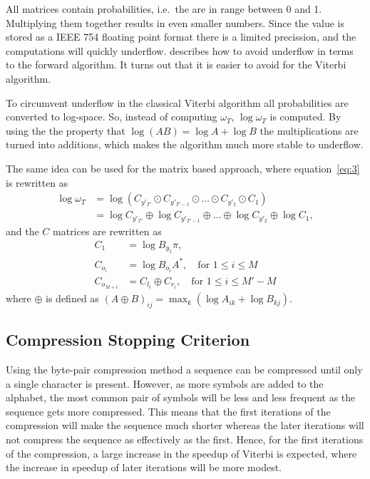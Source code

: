 All matrices contain probabilities, i.e.\ the are in range between 0 and
1. Multiplying them together results in even smaller numbers. Since the value
is stored as a IEEE 754 floating point format there is a limited precission,
and the computations will quickly underflow. \citet{sand2013ziphmmlib}
describes how to avoid underflow in terms to the forward algorithm. It turns
out that it is easier to avoid for the Viterbi algorithm.

To circumvent underflow in the classical Viterbi algorithm all probabilities
are converted to log-space. So, instead of computing $\omega_T$,
$\log \omega_T$ is computed. By using the the property that
$\log(AB) = \log A + \log B$ the multiplications are turned into additions,
which makes the algorithm much more stable to underflow.

The same idea can be used for the matrix based approach, where
equation~\eqref{eq:3} is rewritten as
\begin{align*}
  \log \omega_T &= \log \left(C_{y'_{T'}} \odot C_{y'_{T'-1}} \odot \dots \odot
                  C_{y'_2} \odot C_1 \right) \\
                &= \log C_{y'_{T'}} \oplus \log C_{y'_{T'-1}} \oplus \dots \oplus
                  \log C_{y'_2} \oplus \log C_1,
\end{align*}
and the $C$ matrices are rewritten as
\begin{align*}
  C_1 &= \log B_{y_1} \pi, \\
  C_{o_i} &= \log B_{o_i} A^*, \quad \text{for }1 \le i \le M\\
  C_{o_{M + i}} &= C_{l_i} \oplus C_{r_i} , \quad \text{for }1 \le i \le M' - M
\end{align*}
where $\oplus$ is defined as
${ \left( A \oplus B \right)}_{ij} = \max_k \left( \log A_{ik} + \log B_{kj}
\right)$.


\subsection{Compression Stopping Criterion}
\label{sec:compr-stopp-crit}

Using the byte-pair compression method a sequence can be compressed until only
a single character is present. However, as more symbols are added to the
alphabet, the most common pair of symbols will be less and less frequent as the
sequence gets more compressed. This means that the first iterations of the
compression will make the sequence much shorter whereas the later iterations
will not compress the sequence as effectively as the first. Hence, for the
first iterations of the compression, a large increase in the speedup of Viterbi
is expected, where the increase in speedup of later iterations will be more
modest.

